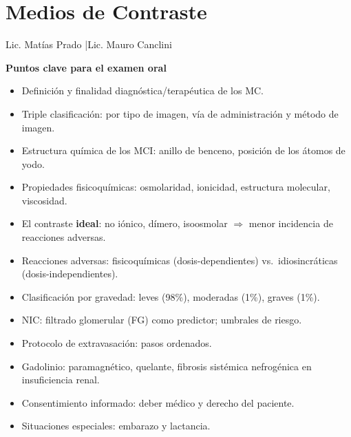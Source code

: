 
\chapter{Medios de Contraste}

{\normalsize\color{gray} Lic. Matías Prado \quad|\quad Lic. Mauro Canclini}
\vspace{1em}

\begin{cajakeypoints}
\textbf{\color{azulprincipal} Puntos clave para el examen oral}
\begin{itemize}[noitemsep, topsep=2pt]
  \item Definición y finalidad diagnóstica/terapéutica de los MC.
  \item Triple clasificación: por tipo de imagen, vía de administración y método de imagen.
  \item Estructura química de los MCI: anillo de benceno, posición de los átomos de yodo.
  \item Propiedades fisicoquímicas: osmolaridad, ionicidad, estructura molecular, viscosidad.
  \item El contraste \textbf{ideal}: no iónico, dímero, isoosmolar $\Rightarrow$ menor incidencia de reacciones adversas.
  \item Reacciones adversas: fisicoquímicas (dosis-dependientes) vs.\ idiosincráticas (dosis-independientes).
  \item Clasificación por gravedad: leves (98\%), moderadas (1\%), graves (1\%).
  \item NIC: filtrado glomerular (FG) como predictor; umbrales de riesgo.
  \item Protocolo de extravasación: pasos ordenados.
  \item Gadolinio: paramagnético, quelante, fibrosis sistémica nefrogénica en insuficiencia renal.
  \item Consentimiento informado: deber médico y derecho del paciente.
  \item Situaciones especiales: embarazo y lactancia.
\end{itemize}
\end{cajakeypoints}

